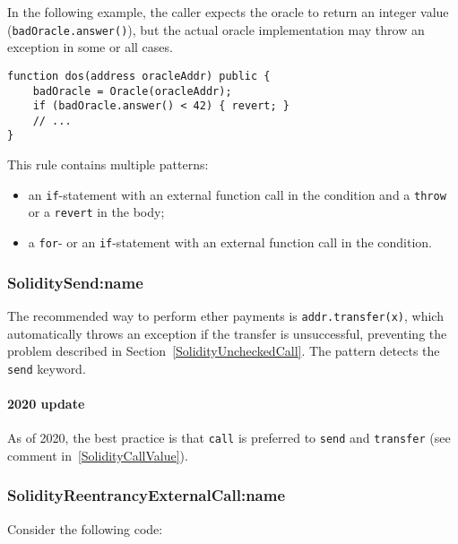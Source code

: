 In the following example, the caller expects the oracle to return an integer value (\texttt{badOracle.answer()}), but the actual oracle implementation may throw an exception in some or all cases.

\begin{lstlisting}[language=Solidity]
function dos(address oracleAddr) public {
	badOracle = Oracle(oracleAddr);
	if (badOracle.answer() < 42) { revert; }
	// ...
}
\end{lstlisting}

This rule contains multiple patterns:
\begin{itemize}
	\item an \texttt{if}-statement with an external function call in the condition and a \texttt{throw} or a \texttt{revert} in the body;
	\item a \texttt{for}- or an \texttt{if}-statement with an external function call in the condition.
\end{itemize}

\subsubsection{\let\letcs\texapiletcs \usevalue SoliditySend:name \let\letcs\etoolboxletcs} \label{SoliditySend}

The recommended way to perform ether payments is \texttt{addr.transfer(x)}, which automatically throws an exception if the transfer is unsuccessful, preventing the problem described in Section~\ref{SolidityUncheckedCall}.
The pattern detects the \texttt{send} keyword.

\paragraph{2020 update}
As of 2020, the best practice is that \texttt{call} is preferred to \texttt{send} and \texttt{transfer} (see comment in~\ref{SolidityCallValue}).

\subsubsection{\let\letcs\texapiletcs \usevalue SolidityReentrancyExternalCall:name \let\letcs\etoolboxletcs} \label{SolidityReentrancyExternalCall}

Consider the following code:

